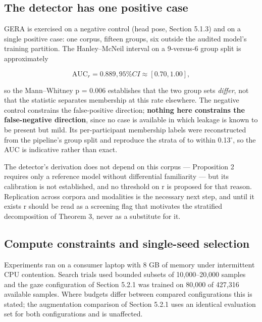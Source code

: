 \FloatBarrier

\subsection{The detector has one positive case}

GERA is exercised on a negative control (head pose, Section 5.1.3) and on a single positive case: one corpus, fifteen groups, six outside the audited model's training partition. The Hanley--McNeil interval  on a 9-versus-6 group split is approximately

\begin{equation}
\label{eq:304}
\mathrm{AUC}_r = 0.889 , 95 \% CI \approx [ 0.70, 1.00 ] ,
\end{equation}

so the Mann--Whitney p = 0.006 establishes that the two group sets \emph{differ}, not that the statistic separates membership at this rate elsewhere. The negative control constrains the false-positive direction; \textbf{nothing here constrains the false-negative direction}, since no case is available in which leakage is known to be present but mild. Its per-participant membership labels were reconstructed from the pipeline's group split and reproduce the strata of  to within 0.13$^{\circ}$, so the AUC is indicative rather than exact.

The detector's derivation does not depend on this corpus --- Proposition 2 requires only a reference model without differential familiarity --- but its calibration is not established, and no threshold on r is proposed for that reason. Replication across corpora and modalities is the necessary next step, and until it exists r should be read as a screening flag that motivates the stratified decomposition of Theorem 3, never as a substitute for it.

\FloatBarrier

\subsection{Compute constraints and single-seed selection}

Experiments ran on a consumer laptop with 8 GB of memory under intermittent CPU contention. Search trials used bounded subsets of 10,000--20,000 samples and the gaze configuration of Section 5.2.1 was trained on 80,000 of 427,316 available samples. Where budgets differ between compared configurations this is stated; the augmentation comparison of Section 5.2.1 uses an identical evaluation set for both configurations and is unaffected.

